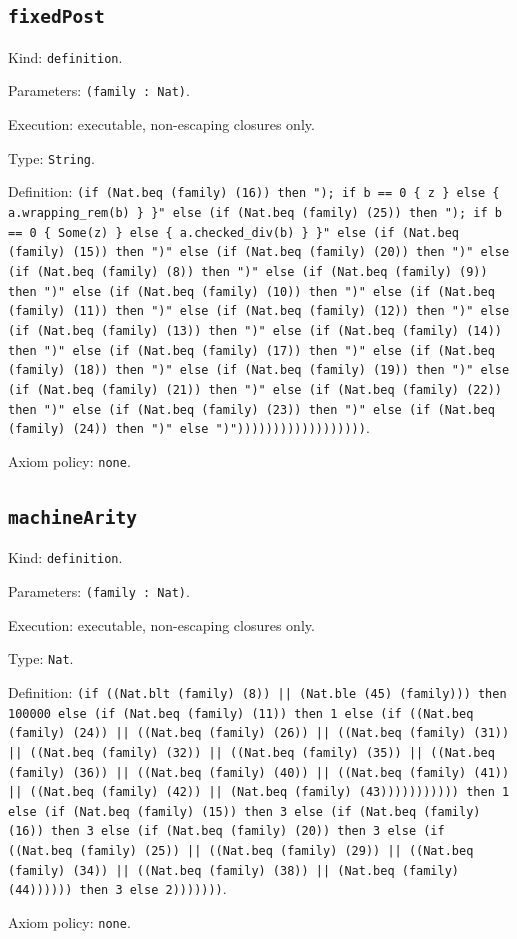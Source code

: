 \documentclass[11pt]{article}
\begin{document}
\subsection*{\texttt{fixedPost}}
\noindent Kind: \texttt{definition}.\par
\noindent Parameters: \texttt{(family : Nat)}.\par
\noindent Execution: executable, non-escaping closures only.\par
\noindent Type: \texttt{String}.\par
\noindent Definition: \texttt{(if (Nat.beq (family) (16)) then "); if b == 0 \{ z \} else \{ a.wrapping\_rem(b) \} \}" else (if (Nat.beq (family) (25)) then "); if b == 0 \{ Some(z) \} else \{ a.checked\_div(b) \} \}" else (if (Nat.beq (family) (15)) then ")" else (if (Nat.beq (family) (20)) then ")" else (if (Nat.beq (family) (8)) then ")" else (if (Nat.beq (family) (9)) then ")" else (if (Nat.beq (family) (10)) then ")" else (if (Nat.beq (family) (11)) then ")" else (if (Nat.beq (family) (12)) then ")" else (if (Nat.beq (family) (13)) then ")" else (if (Nat.beq (family) (14)) then ")" else (if (Nat.beq (family) (17)) then ")" else (if (Nat.beq (family) (18)) then ")" else (if (Nat.beq (family) (19)) then ")" else (if (Nat.beq (family) (21)) then ")" else (if (Nat.beq (family) (22)) then ")" else (if (Nat.beq (family) (23)) then ")" else (if (Nat.beq (family) (24)) then ")" else ")"))))))))))))))))))}.\par
\noindent Axiom policy: \texttt{none}.\par
\subsection*{\texttt{machineArity}}
\noindent Kind: \texttt{definition}.\par
\noindent Parameters: \texttt{(family : Nat)}.\par
\noindent Execution: executable, non-escaping closures only.\par
\noindent Type: \texttt{Nat}.\par
\noindent Definition: \texttt{(if ((Nat.blt (family) (8)) || (Nat.ble (45) (family))) then 100000 else (if (Nat.beq (family) (11)) then 1 else (if ((Nat.beq (family) (24)) || ((Nat.beq (family) (26)) || ((Nat.beq (family) (31)) || ((Nat.beq (family) (32)) || ((Nat.beq (family) (35)) || ((Nat.beq (family) (36)) || ((Nat.beq (family) (40)) || ((Nat.beq (family) (41)) || ((Nat.beq (family) (42)) || (Nat.beq (family) (43))))))))))) then 1 else (if (Nat.beq (family) (15)) then 3 else (if (Nat.beq (family) (16)) then 3 else (if (Nat.beq (family) (20)) then 3 else (if ((Nat.beq (family) (25)) || ((Nat.beq (family) (29)) || ((Nat.beq (family) (34)) || ((Nat.beq (family) (38)) || (Nat.beq (family) (44)))))) then 3 else 2)))))))}.\par
\noindent Axiom policy: \texttt{none}.\par
\end{document}
